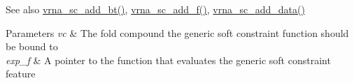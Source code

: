 \begin{DoxySeeAlso}{See also}
\hyperlink{group__soft__constraints_gabde7d07a79bb9a8f4721aee247b674ea}{vrna\+\_\+sc\+\_\+add\+\_\+bt()}, \hyperlink{group__soft__constraints_ga8c7d907ec0125cd61c04e0908010a4e9}{vrna\+\_\+sc\+\_\+add\+\_\+f()}, \hyperlink{group__soft__constraints_ga15c6d52471ec97897e2bb7f964f5deb6}{vrna\+\_\+sc\+\_\+add\+\_\+data()}
\end{DoxySeeAlso}

\begin{DoxyParams}{Parameters}
{\em vc} & The fold compound the generic soft constraint function should be bound to \\
\hline
{\em exp\+\_\+f} & A pointer to the function that evaluates the generic soft constraint feature \\
\hline
\end{DoxyParams}
